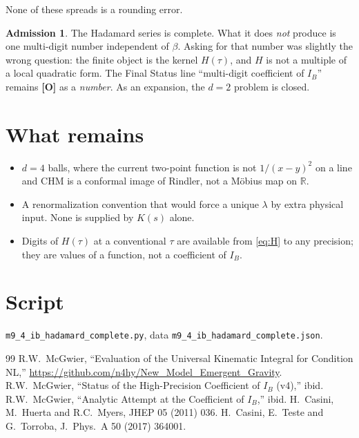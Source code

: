 \documentclass[11pt]{article}
\theoremstyle{definition}
\newtheorem*{admission}{Admission}
\newcommand{\pO}{\textbf{[O]}}
\newcommand{\IB}{I_B}
\begin{document}
None of these spreads is a rounding error.

\begin{admission}
The Hadamard series is complete. What it does \emph{not} produce is
one multi-digit number independent of $\beta$. Asking for that number
was slightly the wrong question: the finite object is the kernel
$H(\tau)$, and $H$ is not a multiple of a local quadratic form.
The Final Status line ``multi-digit coefficient of $\IB$'' remains
\pO{} as a \emph{number}. As an expansion, the $d=2$ problem is
closed.
\end{admission}

\section{What remains}

\begin{itemize}[leftmargin=1.4em]
\item $d=4$ balls, where the current two-point function is not
$1/(x-y)^{2}$ on a line and CHM is a conformal image of Rindler, not
a M\"obius map on $\mathbb{R}$.
\item A renormalization convention that would force a unique
$\lambda$ by extra physical input. None is supplied by $K(s)$ alone.
\item Digits of $H(\tau)$ at a conventional $\tau$ are available from
\eqref{eq:H} to any precision; they are values of a function, not a
coefficient of $\IB$.
\end{itemize}

\section*{Script}
\texttt{m9\_4\_ib\_hadamard\_complete.py}, data
\texttt{m9\_4\_ib\_hadamard\_complete.json}.

\begin{thebibliography}{99}
 R.W.~McGwier, ``Evaluation of the Universal Kinematic Integral for Condition NL,''
\url{https://github.com/n4hy/New_Model_Emergent_Gravity}.
 R.W.~McGwier, ``Status of the High-Precision Coefficient of $\IB$ (v4),'' ibid.
 R.W.~McGwier, ``Analytic Attempt at the Coefficient of $\IB$,'' ibid.
 H.~Casini, M.~Huerta and R.C.~Myers, JHEP 05 (2011) 036.
 H.~Casini, E.~Teste and G.~Torroba, J.\ Phys.\ A 50 (2017) 364001.
\end{thebibliography}
\end{document}
